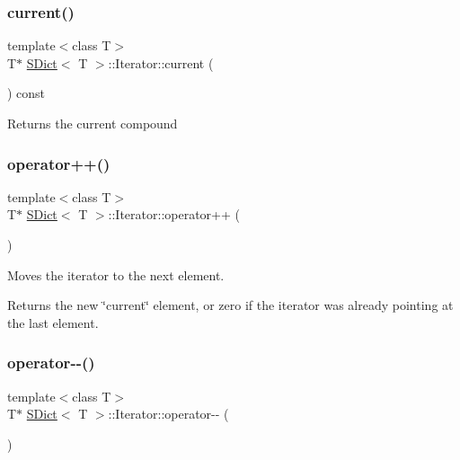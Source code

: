 \subsubsection{\texorpdfstring{current()}{current()}}
{\footnotesize\ttfamily template$<$class T$>$ \\
T$\ast$ \mbox{\hyperlink{class_s_dict}{S\+Dict}}$<$ T $>$\+::Iterator\+::current (\begin{DoxyParamCaption}{ }\end{DoxyParamCaption}) const\hspace{0.3cm}{\ttfamily [inline]}}

Returns the current compound \mbox{\label{class_s_dict_1_1_iterator_ab3172aa53d339348bab5208611044908}} 
\subsubsection{\texorpdfstring{operator++()}{operator++()}}
{\footnotesize\ttfamily template$<$class T$>$ \\
T$\ast$ \mbox{\hyperlink{class_s_dict}{S\+Dict}}$<$ T $>$\+::Iterator\+::operator++ (\begin{DoxyParamCaption}{ }\end{DoxyParamCaption})\hspace{0.3cm}{\ttfamily [inline]}}

Moves the iterator to the next element. \begin{DoxyReturn}{Returns}
the new \char`\"{}current\char`\"{} element, or zero if the iterator was already pointing at the last element. 
\end{DoxyReturn}
\mbox{\label{class_s_dict_1_1_iterator_ab660d0dacf804b314112c5ac9ea41714}} 
\subsubsection{\texorpdfstring{operator-\/-\/()}{operator--()}}
{\footnotesize\ttfamily template$<$class T$>$ \\
T$\ast$ \mbox{\hyperlink{class_s_dict}{S\+Dict}}$<$ T $>$\+::Iterator\+::operator-\/-\/ (\begin{DoxyParamCaption}{ }\end{DoxyParamCaption})\hspace{0.3cm}{\ttfamily [inline]}}

